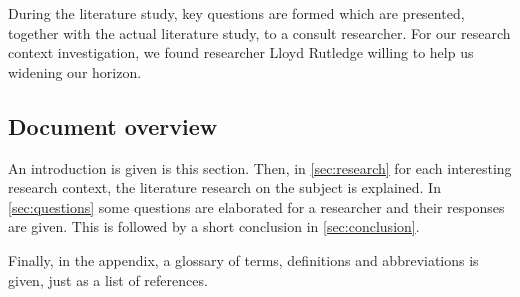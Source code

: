 During the literature study, key questions are formed which are presented, together with the actual literature study, to a consult researcher.
For our research context investigation, we found researcher Lloyd Rutledge willing to help us widening our horizon.


\subsection{Document overview}
An introduction is given is this section.
Then, in \autoref{sec:research} for each interesting research context, the literature research on the subject is explained.
In \autoref{sec:questions} some questions are elaborated for a researcher and their responses are given.
This is followed by a short conclusion in \autoref{sec:conclusion}.

Finally, in the appendix, a glossary of terms, definitions and abbreviations is given, just as a list of references.
